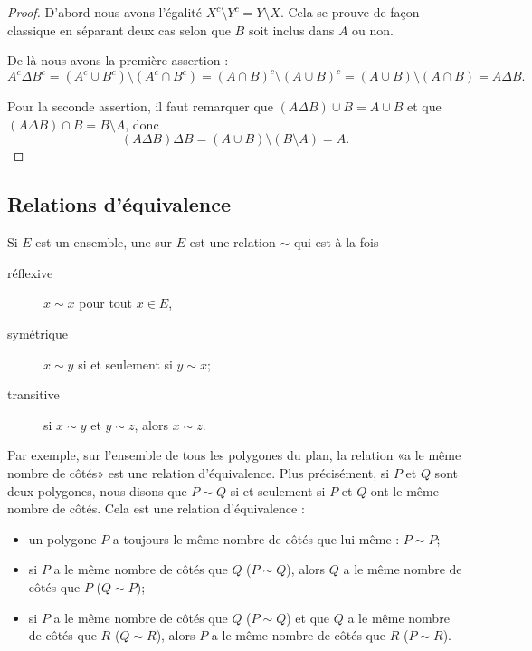 \begin{proof}
    D'abord nous avons l'égalité \( X^c\setminus Y^c=Y\setminus X\). Cela se prouve de façon classique en séparant deux cas selon que \( B\) soit inclus dans \( A\) ou non.
    
    De là nous avons la première assertion :
    \begin{equation}
        A^c\Delta B^c=(A^c\cup B^c)\setminus(A^c\cap B^c)=(A\cap B)^c\setminus(A\cup B)^c=(A\cup B)\setminus (A\cap B)=A\Delta B.
    \end{equation}

    Pour la seconde assertion, il faut remarquer que \( (A\Delta B)\cup B=A\cup B\) et que \( (A\Delta B)\cap B=B\setminus A\), donc
    \begin{equation}
        (A\Delta B)\Delta B=(A\cup B)\setminus (B\setminus A)=A.
    \end{equation}
\end{proof}

\subsection{Relations d'équivalence}
\label{appEquivalence}

\begin{definition}  \label{DefHoJzMp}
Si $E$ est un ensemble, une  sur $E$ est une relation $\sim$ qui est à la fois
\begin{description}
	\item[réflexive] $x\sim x$ pour tout $x\in E$,
	\item[symétrique] $x\sim y$ si et seulement si $y\sim x$;
	\item[transitive] si $x\sim y$ et $y\sim z$, alors $x\sim z$.
\end{description}
\end{definition}

Par exemple, sur l'ensemble de tous les polygones du plan, la relation «a le même nombre de côtés» est une relation d'équivalence. Plus précisément, si $P$ et $Q$ sont deux polygones, nous disons que $P\sim Q$ si et seulement si $P$ et $Q$ ont le même nombre de côtés. Cela est une relation d'équivalence :
\begin{itemize}
	\item 
		un polygone $P$ a toujours le même nombre de côtés que lui-même : $P\sim P$;
	\item
		si $P$ a le même nombre de côtés que $Q$ ($P\sim Q$), alors $Q$ a le même nombre de côtés que $P$ ($Q\sim P$);
	\item
		si $P$ a le même nombre de côtés que $Q$ ($P\sim Q$) et que $Q$ a le même nombre de côtés que $R$ ($Q\sim R$), alors $P$ a le même nombre de côtés que $R$ ($P\sim R$).
\end{itemize}

